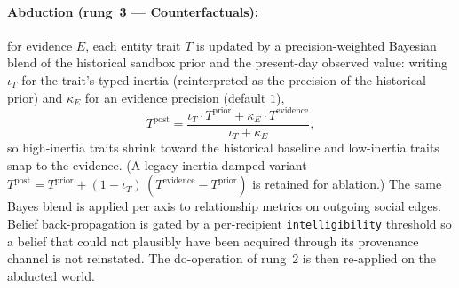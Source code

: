 \documentclass[11pt]{article}
\begin{document}
\paragraph{Abduction (rung~3 --- Counterfactuals):} for evidence
$E$, each entity trait $T$ is updated by a precision-weighted
Bayesian blend of the historical sandbox prior and the present-day
observed value: writing $\iota_T$ for the trait's typed inertia
(reinterpreted as the precision of the historical prior) and
$\kappa_E$ for an evidence precision (default $1$),
\begin{equation}
\label{eq:abduction}
T^{\mathrm{post}} =
\frac{\iota_T \cdot T^{\mathrm{prior}} +
      \kappa_E \cdot T^{\mathrm{evidence}}}{\iota_T + \kappa_E},
\end{equation}
so high-inertia traits shrink toward the historical baseline and
low-inertia traits snap to the evidence. (A legacy
inertia-damped variant
$T^{\mathrm{post}} = T^{\mathrm{prior}} +
(1 - \iota_T)\,(T^{\mathrm{evidence}} - T^{\mathrm{prior}})$ is
retained for ablation.) The same Bayes blend is applied per axis
to relationship metrics on outgoing social edges. Belief
back-propagation is gated by a per-recipient
\texttt{intelligibility} threshold so a belief that could not
plausibly have been acquired through its provenance channel is
not reinstated. The do-operation of rung~2 is then re-applied on
the abducted world.
\end{document}
